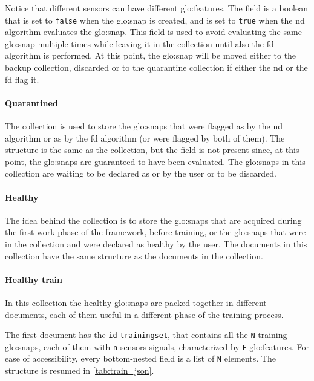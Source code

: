 Notice that different sensors can have different \gls{glo:feature}s. The  field is a boolean that is set to \texttt{false} when the \gls{glo:snap} is created, and is set to \texttt{true} when the \gls{nd} algorithm evaluates the \gls{glo:snap}. This field is used to avoid evaluating the same \gls{glo:snap} multiple times while leaving it in the collection until also the \gls{fd} algorithm is performed. At this point, the \gls{glo:snap} will be moved either to the backup collection, discarded or to the quarantine collection if either the \gls{nd} or the \gls{fd} flag it.

\paragraph{Quarantined}
The  collection is used to store the \gls{glo:snap}s that were flagged as  by the \gls{nd} algorithm or as  by the \gls{fd} algorithm (or were flagged by both of them). The structure is the same as the  collection, but the  field is not present since, at this point, the \gls{glo:snap}s are guaranteed to have been evaluated. The \gls{glo:snap}s in this collection are waiting to be declared as  or  by the user or to be discarded.

\paragraph{Healthy}
The idea behind the  collection is to store the \gls{glo:snap}s that are acquired during the first work phase of the framework, before training, or the \gls{glo:snap}s that were in the  collection and were declared as healthy by the user. The documents in this collection have the same structure as the documents in the  collection.

\paragraph{Healthy train}
In this collection the healthy \gls{glo:snap}s are packed together in different documents, each of them useful in a different phase of the training process.

{The first document has the \texttt{id} \texttt{training\textunderscore set}, that contains all the \texttt{N} training \gls{glo:snap}s, each of them with \texttt{n} sensors signals, characterized by \texttt{F} \gls{glo:feature}s. For ease of accessibility, every bottom-nested field is a list of \texttt{N} elements. The structure is resumed in \autoref{tab:train_json}.}


